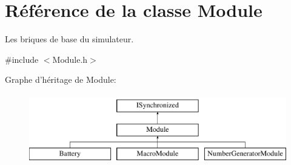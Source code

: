 \hypertarget{classModule}{\section{Référence de la classe Module}
\label{classModule}
}


Les briques de base du simulateur.  




{\ttfamily \#include $<$Module.\-h$>$}

Graphe d'héritage de Module\-:\begin{figure}[H]
\begin{center}
\leavevmode
\includegraphics[height=3.000000cm]{classModule}
\end{center}
\end{figure}
